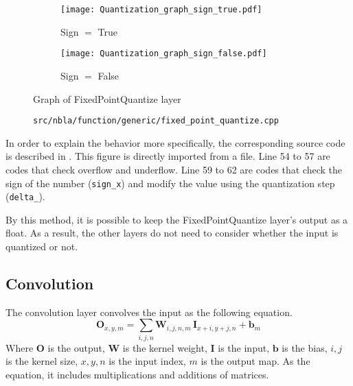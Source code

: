 \begin{figure}[tbp]
  \centering
  \begin{subfigure}[b]{0.45\textwidth}
    \centering
    \texttt{[image: Quantization\_graph\_sign\_true.pdf]}
    \caption{Sign $=$ True}
    \label{subfig:quant_graph_signed}
  \end{subfigure}
  \hfill
  \begin{subfigure}[b]{0.45\textwidth}
    \centering
    \texttt{[image: Quantization\_graph\_sign\_false.pdf]}
    \caption{Sign $=$ False}
    \label{subfig:quant_graph_unsigned}
  \end{subfigure}
  \caption{Graph of FixedPointQuantize layer}%
  \label{fig:quant_graph}
\end{figure}

\begin{figure}[tbp]
  \centering
  
  \caption{\texttt{src/nbla/function/generic/fixed\_point\_quantize.cpp}}
  \label{fig:fixedpointquantize}
\end{figure}

In order to explain the behavior more specifically, the corresponding source code is described in . This figure is directly imported from a file. Line 54 to 57 are codes that check overflow and underflow. Line 59 to 62 are codes that check the sign of the number (\texttt{sign\_x}) and modify the value using the quantization step (\texttt{delta\_}).

By this method, it is possible to keep the FixedPointQuantize layer's output as a float. As a result, the other layers do not need to consider whether the input is quantized or not.

\subsection{Convolution}
The convolution layer convolves the input as the following equation.
\begin{equation}\label{eq:conv}
  \textbf{O}_{x,y,m} = \sum_{i,j,n} \textbf{W}_{i,j,n,m} \, \textbf{I}_{x+i,y+j,n} + \textbf{b}_m
\end{equation}
Where $\textbf{O}$ is the output, $\textbf{W}$ is the kernel weight, $\textbf{I}$ is the input, $\textbf{b}$ is the bias, $i,j$ is the kernel size, $x,y,n$ is the input index, $m$ is the output map. As the equation, it includes multiplications and additions of matrices.

